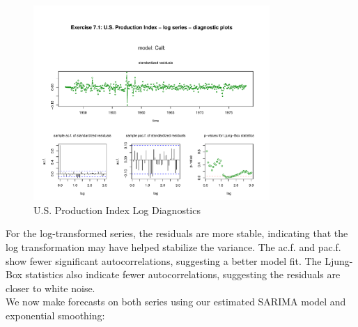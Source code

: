 \begin{figure}[H]
\centering
\includegraphics[width=0.8\textwidth]{plots/UsProdLogDiag.pdf}
\caption{U.S. Production Index Log Diagnostics}
\end{figure}

For the log-transformed series, the residuals are more stable, indicating that the log transformation may have helped stabilize the variance. The ac.f. and pac.f. show fewer significant autocorrelations, suggesting a better model fit. The Ljung-Box statistics also indicate fewer autocorrelations, suggesting the residuals are closer to white noise.\\

We now make forecasts on both series using our estimated SARIMA model and exponential smoothing:\\

